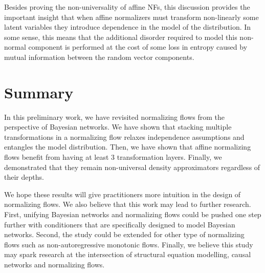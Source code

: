 Besides proving the non-universality of affine NFs, this discussion provides the important insight that when affine normalizers must transform non-linearly some latent variables they introduce dependence in the model of the distribution. In some sense, this means that the additional disorder required to model this non-normal component is performed at the cost of some loss in entropy caused by mutual information between the random vector components.
\section{Summary}

In this preliminary work, we have revisited normalizing flows from the perspective of Bayesian networks.
We have shown that stacking multiple transformations in a normalizing flow relaxes independence assumptions and entangles the model distribution.
Then, we have shown that affine normalizing flows benefit from having at least 3 transformation layers.
Finally, we demonstrated that they remain non-universal density approximators regardless of their depths.


We hope these results will give practitioners more intuition in the design of normalizing flows.
We also believe that this work may lead to further research.
First, unifying Bayesian networks and normalizing flows could be pushed one step further with conditioners that are specifically designed to model Bayesian networks.
Second, the study could be extended for other type of normalizing flows such as non-autoregressive monotonic flows.
Finally, we believe this study may spark research at the intersection of structural equation modelling, causal networks and normalizing flows.
